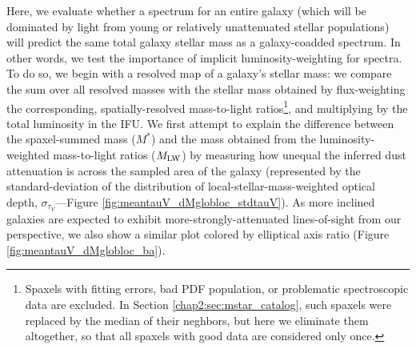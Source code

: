 Here, we evaluate whether a spectrum for an entire galaxy (which will be dominated by light from young or relatively unattenuated stellar populations) will predict the same total galaxy stellar mass as a galaxy-coadded spectrum. In other words, we test the importance of implicit luminosity-weighting for spectra. To do so, we begin with a resolved map of a galaxy's stellar mass: we compare the sum over all resolved masses with the stellar mass obtained by flux-weighting the corresponding, spatially-resolved mass-to-light ratios\footnote{Spaxels with fitting errors, bad PDF population, or problematic spectroscopic data are excluded. In Section \ref{chap2:sec:mstar_catalog}, such spaxels were replaced by the median of their neghbors, but here we eliminate them altogether, so that all spaxels with good data are considered only once.}, and multiplying by the total luminosity in the IFU. We first attempt to explain the difference between the spaxel-summed mass ($M^*$) and the mass obtained from the luminosity-weighted mass-to-light ratios ($M_{\rm LW}$) by measuring how unequal the inferred dust attenuation is across the sampled area of the galaxy (represented by the standard-deviation of the distribution of local-stellar-mass-weighted optical depth, $\sigma_{\tau_V}$---Figure \ref{fig:meantauV_dMglobloc_stdtauV}). As more inclined galaxies are expected to exhibit more-strongly-attenuated lines-of-sight from our perspective, we also show a similar plot colored by elliptical axis ratio (Figure \ref{fig:meantauV_dMglobloc_ba}).


